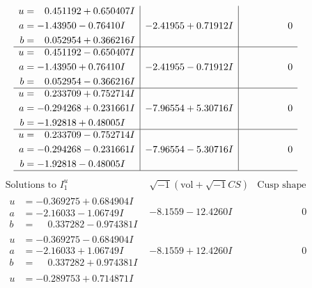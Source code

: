 \documentclass[1p]{elsarticle_modified}
\theoremstyle{definition}
\newcommand{\I}{\sqrt{-1}}
\begin{document}
$$\begin{array}{c|c|c}
\begin{aligned}
u &= \phantom{-}0.451192 + 0.650407 I \\
a &= -1.43950 - 0.76410 I \\
b &= \phantom{-}0.052954 + 0.366216 I\end{aligned}
 & -2.41955 + 0.71912 I & \phantom{-0.000000 } 0 \\ \hline\begin{aligned}
u &= \phantom{-}0.451192 - 0.650407 I \\
a &= -1.43950 + 0.76410 I \\
b &= \phantom{-}0.052954 - 0.366216 I\end{aligned}
 & -2.41955 - 0.71912 I & \phantom{-0.000000 } 0 \\ \hline\begin{aligned}
u &= \phantom{-}0.233709 + 0.752714 I \\
a &= -0.294268 + 0.231661 I \\
b &= -1.92818 + 0.48005 I\end{aligned}
 & -7.96554 + 5.30716 I & \phantom{-0.000000 } 0 \\ \hline\begin{aligned}
u &= \phantom{-}0.233709 - 0.752714 I \\
a &= -0.294268 - 0.231661 I \\
b &= -1.92818 - 0.48005 I\end{aligned}
 & -7.96554 - 5.30716 I & \phantom{-0.000000 } 0\\
 \hline 
 \end{array}$$\newpage$$\begin{array}{c|c|c}  
\text{Solutions to }I^u_{1}& \I (\text{vol} + \sqrt{-1}CS) & \text{Cusp shape}\\
 \hline 
\begin{aligned}
u &= -0.369275 + 0.684904 I \\
a &= -2.16033 - 1.06749 I \\
b &= \phantom{-}0.337282 - 0.974381 I\end{aligned}
 & -8.1559 - 12.4260 I & \phantom{-0.000000 } 0 \\ \hline\begin{aligned}
u &= -0.369275 - 0.684904 I \\
a &= -2.16033 + 1.06749 I \\
b &= \phantom{-}0.337282 + 0.974381 I\end{aligned}
 & -8.1559 + 12.4260 I & \phantom{-0.000000 } 0 \\ \hline\begin{aligned}
u &= -0.289753 + 0.714871 I \\

\end{aligned}
\end{array}$$
\end{document}
